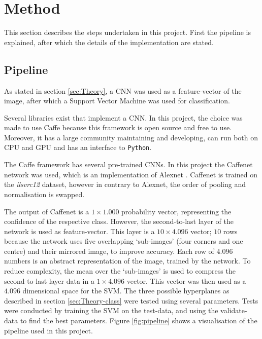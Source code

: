 \section{Method}
\label{sec:Method}
This section describes the steps undertaken in this project.
First the pipeline is explained, after which the details of the implementation are stated.

\subsection{Pipeline}
\label{sec:Method-pipeline}
As stated in section \ref{sec:Theory}, a CNN was used as a feature-vector of the image, after which a Support Vector Machine was used for classification.

Several libraries exist that implement a CNN.
In this project, the choice was made to use Caffe \citep{jia2014caffe} because this framework is open source and free to use.
Moreover, it has a large community maintaining and developing, can run both on CPU and GPU and has an interface to \texttt{Python}.

The Caffe framework has several pre-trained CNNs.
In this project the Caffenet network was used, which is an implementation of Alexnet \citep{krizhevsky2012imagenet}. Caffenet is trained on the \textit{ilsvrc12} dataset, however in contrary to Alexnet, the order of pooling and normalisation is swapped.

The output of Caffenet is a $1\times1.000$ probability vector, representing the confidence of the respective class.
However, the second-to-last layer of the network is used as feature-vector. This layer is a $10\times4.096$ vector; $10$ rows because the network uses five overlapping `sub-images' (four corners and one centre) and their mirrored image, to improve accuracy.
Each row of $4.096$ numbers is an abstract representation of the image, trained by the network.
To reduce complexity, the mean over the `sub-images' is used to compress the second-to-last layer data in a $1\times4.096$ vector.
This vector was then used as a $4.096$ dimensional space for the SVM.
The three possible hyperplanes as described in section \ref{sec:Theory-class} were tested using several parameters.
Tests were conducted by training the SVM on the test-data, and using the validate-data to find the best parameters.
Figure \ref{fig:pipeline} shows a visualisation of the pipeline used in this project.


